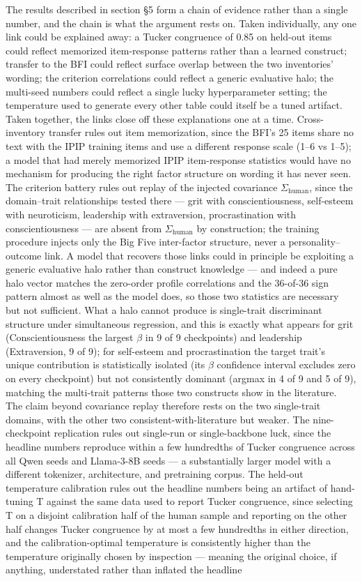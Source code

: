 \documentclass[11pt]{article}
\begin{document}
The results described in section \S{}5 form a chain of evidence rather than a single number, and the chain is what the argument rests on. Taken individually, any one link could be explained away: a Tucker congruence of 0.85 on held-out items could reflect memorized item-response patterns rather than a learned construct; transfer to the BFI could reflect surface overlap between the two inventories' wording; the criterion correlations could reflect a generic evaluative halo; the multi-seed numbers could reflect a single lucky hyperparameter setting; the temperature used to generate every other table could itself be a tuned artifact. Taken together, the links close off these explanations one at a time. Cross-inventory transfer  rules out item memorization, since the BFI's 25 items share no text with the IPIP training items and use a different response scale (1–6 vs 1–5); a model that had merely memorized IPIP item-response statistics would have no mechanism for producing the right factor structure on wording it has never seen. The criterion battery rules out replay of the injected covariance $\Sigma_{\text{human}}$, since the domain–trait relationships tested there — grit with conscientiousness, self-esteem with neuroticism, leadership with extraversion, procrastination with conscientiousness — are absent from $\Sigma_{\text{human}}$ by construction; the training procedure injects only the Big Five inter-factor structure, never a personality–outcome link. A model that recovers those links could in principle be exploiting a generic evaluative halo rather than construct knowledge — and indeed a pure halo vector matches the zero-order profile correlations and the 36-of-36 sign pattern almost as well as the model does, so those two statistics are necessary but not sufficient. What a halo cannot produce is single-trait discriminant structure under simultaneous regression, and this is exactly what appears for grit (Conscientiousness the largest $\beta$ in 9 of 9 checkpoints) and leadership (Extraversion, 9 of 9); for self-esteem and procrastination the target trait's unique contribution is statistically isolated (its $\beta$ confidence interval excludes zero on every checkpoint) but not consistently dominant (argmax in 4 of 9 and 5 of 9), matching the multi-trait patterns those two constructs show in the literature. The claim beyond covariance replay therefore rests on the two single-trait domains, with the other two consistent-with-literature but weaker. The nine-checkpoint replication rules out single-run or single-backbone luck, since the headline numbers reproduce within a few hundredths of Tucker congruence across all Qwen seeds and Llama-3-8B seeds — a substantially larger model with a different tokenizer, architecture, and pretraining corpus. The held-out temperature calibration rules out the headline numbers being an artifact of hand-tuning T against the same data used to report Tucker congruence, since selecting T on a disjoint calibration half of the human sample and reporting on the other half changes Tucker congruence by at most a few hundredths in either direction, and the calibration-optimal temperature is consistently higher than the temperature originally chosen by inspection — meaning the original choice, if anything, understated rather than inflated the headline 
\end{document}
